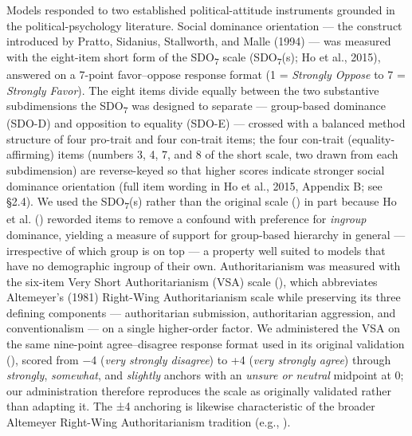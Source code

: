 \documentclass[
]{article}
\begin{document}
Models responded to two established political-attitude instruments
grounded in the political-psychology literature. Social dominance
orientation --- the construct introduced by Pratto, Sidanius,
Stallworth, and Malle (1994) --- was measured with the eight-item short
form of the SDO\textsubscript{7} scale (SDO\textsubscript{7}(s); Ho et
al., 2015), answered on a 7-point favor--oppose response format (1 =
\emph{Strongly Oppose} to 7 = \emph{Strongly Favor}). The eight items
divide equally between the two substantive subdimensions the
SDO\textsubscript{7} was designed to separate --- group-based dominance
(SDO-D) and opposition to equality (SDO-E) --- crossed with a balanced
method structure of four pro-trait and four con-trait items; the four
con-trait (equality-affirming) items (numbers 3, 4, 7, and 8 of the
short scale, two drawn from each subdimension) are reverse-keyed so that
higher scores indicate stronger social dominance orientation (full item
wording in Ho et al., 2015, Appendix B; see §2.4). We used the
SDO\textsubscript{7}(s) rather than the original scale
() in part because Ho et
al. () reworded items to remove a confound
with preference for \emph{ingroup} dominance, yielding a measure of
support for group-based hierarchy in general --- irrespective of which
group is on top --- a property well suited to models that have no
demographic ingroup of their own. Authoritarianism was measured with the
six-item Very Short Authoritarianism (VSA) scale
(), which
abbreviates Altemeyer's (1981) Right-Wing Authoritarianism scale while
preserving its three defining components --- authoritarian submission,
authoritarian aggression, and conventionalism --- on a single
higher-order factor. We administered the VSA on the same nine-point
agree--disagree response format used in its original validation
(), scored from −4
(\emph{very strongly disagree}) to +4 (\emph{very strongly agree})
through \emph{strongly}, \emph{somewhat}, and \emph{slightly} anchors
with an \emph{unsure or neutral} midpoint at 0; our administration
therefore reproduces the scale as originally validated rather than
adapting it. The ±4 anchoring is likewise characteristic of the broader
Altemeyer Right-Wing Authoritarianism tradition (e.g.,
).
\end{document}
